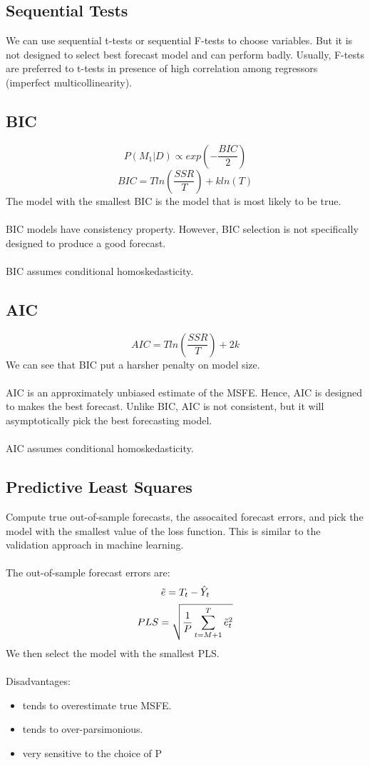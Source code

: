 \documentclass{article}
\begin{document}
\subsection{Sequential Tests}
We can use sequential t-tests or sequential F-tests to choose variables. But it is not designed to select best forecast model and can perform badly. Usually, F-tests are preferred to t-tests in presence of high correlation among regressors (imperfect multicollinearity).

\subsection{BIC}
$$P(M_1|D) \propto exp\left(-\frac{BIC}{2}\right)$$
$$BIC = Tln\left(\frac{SSR}{T}\right) + kln(T)$$
The model with the smallest BIC is the model that is most likely to be true.\\
\\
BIC models have consistency property. However, BIC selection is not specifically designed to produce a good forecast.\\
\\
BIC assumes conditional homoskedasticity.

\subsection{AIC}
$$AIC = Tln\left(\frac{SSR}{T}\right) + 2k$$
We can see that BIC put a harsher penalty on model size.\\
\\
AIC is an approximately unbiased estimate of the MSFE. Hence, AIC is designed to makes the best forecast. Unlike BIC, AIC is not consistent, but it will asymptotically pick the best forecasting model.\\
\\
AIC assumes conditional homoskedasticity.

\subsection{Predictive Least Squares}
Compute true out-of-sample forecasts, the assocaited forecast errors, and pick the model with the smallest value of the loss function. This is similar to the validation approach in machine learning.\\
\\
The out-of-sample forecast errors are:
$$\Tilde{e} = T_t - \hat{Y}_t$$
$$PLS = \sqrt{\frac{1}{P}\sum_{t=M+1}^T \Tilde{e}_t^2}$$
We then select the model with the smallest PLS.\\
\\
Disadvantages:
\begin{itemize}
    \item tends to overestimate true MSFE.
    \item tends to over-parsimonious.
    \item very sensitive to the choice of P
\end{itemize}
\end{document}
